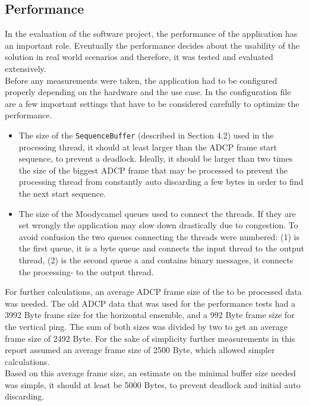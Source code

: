 \subsection{Performance}
In the evaluation of the software project, the performance of the application has an important role. Eventually the performance decides about the usability of the solution in real world scenarios and therefore, it was tested and evaluated extensively.\\
Before any measurements were taken, the application had to be configured properly depending on the hardware and the use case. In the configuration file are a few important settings that have to be considered carefully to optimize the performance.
\begin{itemize}
\item The size of the \texttt{SequenceBuffer} (described in Section 4.2) used in the processing thread, it should at least larger than the ADCP frame start sequence, to prevent a deadlock. Ideally, it should be larger than two times the size of the biggest ADCP frame that may be processed to prevent the processing thread from constantly auto discarding a few bytes in order to find the next start sequence.
\item The size of the Moodycamel queues used to connect the threads. If they are set wrongly the application may slow down drastically due to congestion. To avoid confusion the two queues connecting the threads were numbered: (1) is the first queue, it is a byte queue and connects the input thread to the output thread, (2) is the second queue a and contains binary messages, it connects the processing- to the output thread.
\end{itemize}

For further calculations, an average ADCP frame size of the to be processed data was needed. The old ADCP data that was used for the performance tests had a 3992 Byte frame size for the horizontal ensemble, and a 992 Byte frame size for the vertical ping. The sum of both sizes was divided by two to get an average frame size of 2492 Byte. For the sake of simplicity further measurements in this report assumed an average frame size of 2500 Byte, which allowed simpler calculations.\\
Based on this average frame size, an estimate on the minimal buffer size needed was simple, it should at least be 5000 Bytes, to prevent deadlock and initial auto discarding.

